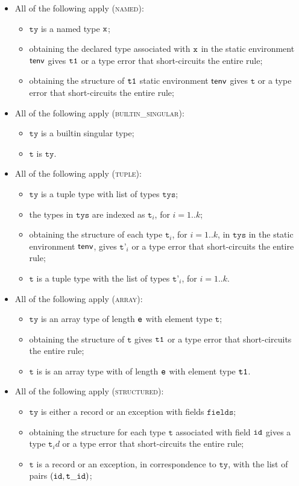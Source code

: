 \documentclass{book}
\newcommand\ProseOrTypeError[0]{or a type error that short-circuits the entire rule}
\newcommand\vt[0]{\texttt{t}}
\newcommand\tty[0]{\texttt{ty}}
\newcommand\fields[0]{\texttt{fields}}
\newcommand\vtp[0]{\texttt{t'}}
\newcommand\tys[0]{\texttt{tys}}
\begin{document}
\begin{itemize}
\item All of the following apply (\textsc{named}):
  \begin{itemize}
  \item $\tty$ is a named type $\texttt{x}$;
  \item obtaining the declared type associated with $\texttt{x}$ in the static environment $\textsf{tenv}$ gives $\texttt{t1}$ \ProseOrTypeError;
  \item obtaining the structure of $\texttt{t1}$ static environment $\textsf{tenv}$ gives $\vt$ \ProseOrTypeError;
  \end{itemize}
\item All of the following apply (\textsc{builtin\_singular}):
  \begin{itemize}
  \item $\tty$ is a builtin singular type;
  \item $\vt$ is $\tty$.
  \end{itemize}
\item All of the following apply (\textsc{tuple}):
  \begin{itemize}
  \item $\tty$ is a tuple type with list of types $\tys$;
  \item the types in $\tys$ are indexed as $\vt_i$, for $i=1..k$;
  \item obtaining the structure of each type $\vt_i$, for $i=1..k$, in $\tys$ in the static environment $\textsf{tenv}$,
  gives $\vtp_i$ \ProseOrTypeError;
  \item $\vt$ is a tuple type with the list of types $\vtp_i$, for $i=1..k$.
  \end{itemize}
\item All of the following apply (\textsc{array}):
  \begin{itemize}
    \item $\tty$ is an array type of length $\texttt{e}$ with element type $\vt$;
    \item obtaining the structure of $\vt$ gives $\texttt{t1}$ \ProseOrTypeError;
    \item $\vt$ is is an array type with of length $\texttt{e}$ with element type $\texttt{t1}$.
  \end{itemize}
\item All of the following apply (\textsc{structured}):
  \begin{itemize}
  \item $\tty$ is either a record or an exception with fields $\fields$;
  \item obtaining the structure for each type $\vt$ associated with field $\texttt{id}$ gives a type $\vt_id$ \ProseOrTypeError;
  \item $\vt$ is a record or an exception, in correspondence to $\tty$, with the list of pairs $(\id, \vt\_\id)$;
  \end{itemize}
\end{itemize}
\end{document}
